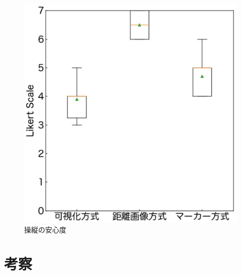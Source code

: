 \documentclass[submit,techrep]{ipsj}
\begin{document}


\begin{figure}[tb]
\centering
\includegraphics[width=\linewidth]{img/04_likert1.eps}
\caption{操縦の安心度}
\label{fig:04_likert1}
\end{figure}



\section{考察}
\end{document}
